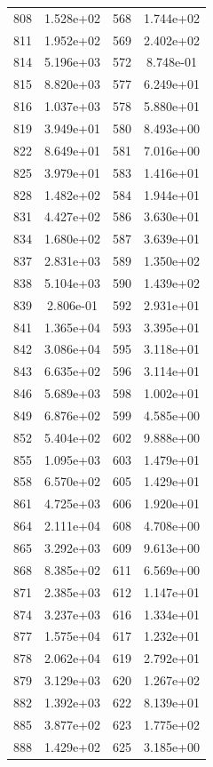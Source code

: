 \documentclass[12pt]{article}
\begin{document}
\begin{longtable}{@{}cccc@{}}
808 & 1.528e+02 & 568 & 1.744e+02 \\
811 & 1.952e+02 & 569 & 2.402e+02 \\
814 & 5.196e+03 & 572 & 8.748e-01 \\
815 & 8.820e+03 & 577 & 6.249e+01 \\
816 & 1.037e+03 & 578 & 5.880e+01 \\
819 & 3.949e+01 & 580 & 8.493e+00 \\
822 & 8.649e+01 & 581 & 7.016e+00 \\
825 & 3.979e+01 & 583 & 1.416e+01 \\
828 & 1.482e+02 & 584 & 1.944e+01 \\
831 & 4.427e+02 & 586 & 3.630e+01 \\
834 & 1.680e+02 & 587 & 3.639e+01 \\
837 & 2.831e+03 & 589 & 1.350e+02 \\
838 & 5.104e+03 & 590 & 1.439e+02 \\
839 & 2.806e-01 & 592 & 2.931e+01 \\
841 & 1.365e+04 & 593 & 3.395e+01 \\
842 & 3.086e+04 & 595 & 3.118e+01 \\
843 & 6.635e+02 & 596 & 3.114e+01 \\
846 & 5.689e+03 & 598 & 1.002e+01 \\
849 & 6.876e+02 & 599 & 4.585e+00 \\
852 & 5.404e+02 & 602 & 9.888e+00 \\
855 & 1.095e+03 & 603 & 1.479e+01 \\
858 & 6.570e+02 & 605 & 1.429e+01 \\
861 & 4.725e+03 & 606 & 1.920e+01 \\
864 & 2.111e+04 & 608 & 4.708e+00 \\
865 & 3.292e+03 & 609 & 9.613e+00 \\
868 & 8.385e+02 & 611 & 6.569e+00 \\
871 & 2.385e+03 & 612 & 1.147e+01 \\
874 & 3.237e+03 & 616 & 1.334e+01 \\
877 & 1.575e+04 & 617 & 1.232e+01 \\
878 & 2.062e+04 & 619 & 2.792e+01 \\
879 & 3.129e+03 & 620 & 1.267e+02 \\
882 & 1.392e+03 & 622 & 8.139e+01 \\
885 & 3.877e+02 & 623 & 1.775e+02 \\
888 & 1.429e+02 & 625 & 3.185e+00 \\

\end{longtable}
\end{document}
